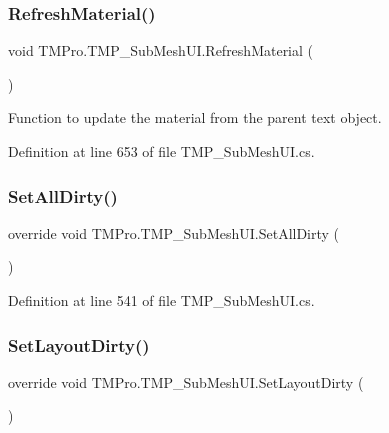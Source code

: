 \mbox{\label{class_t_m_pro_1_1_t_m_p___sub_mesh_u_i_ac6bb1546f8b9fe175ba68e2d253935b5}} 
\subsubsection{\texorpdfstring{RefreshMaterial()}{RefreshMaterial()}}
{\footnotesize\ttfamily void T\+M\+Pro.\+T\+M\+P\+\_\+\+Sub\+Mesh\+U\+I.\+Refresh\+Material (\begin{DoxyParamCaption}{ }\end{DoxyParamCaption})}



Function to update the material from the parent text object. 



Definition at line 653 of file T\+M\+P\+\_\+\+Sub\+Mesh\+U\+I.\+cs.

\mbox{\label{class_t_m_pro_1_1_t_m_p___sub_mesh_u_i_abb694c1dd941ef112c04d913fb460044}} 
\subsubsection{\texorpdfstring{SetAllDirty()}{SetAllDirty()}}
{\footnotesize\ttfamily override void T\+M\+Pro.\+T\+M\+P\+\_\+\+Sub\+Mesh\+U\+I.\+Set\+All\+Dirty (\begin{DoxyParamCaption}{ }\end{DoxyParamCaption})}







Definition at line 541 of file T\+M\+P\+\_\+\+Sub\+Mesh\+U\+I.\+cs.

\mbox{\label{class_t_m_pro_1_1_t_m_p___sub_mesh_u_i_af0fb2011a25e14eab43fe51adbc62cbb}} 
\subsubsection{\texorpdfstring{SetLayoutDirty()}{SetLayoutDirty()}}
{\footnotesize\ttfamily override void T\+M\+Pro.\+T\+M\+P\+\_\+\+Sub\+Mesh\+U\+I.\+Set\+Layout\+Dirty (\begin{DoxyParamCaption}{ }\end{DoxyParamCaption})}







